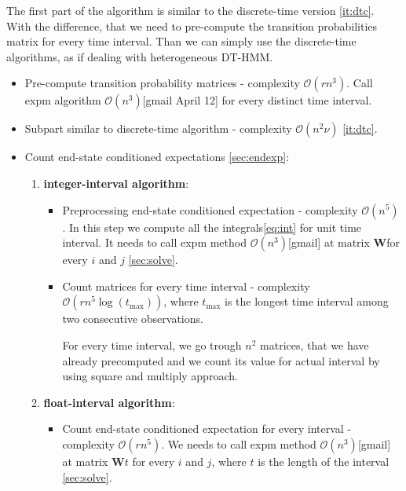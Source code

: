 \documentclass[thesis=M,english]{FITthesis}[2012/10/20]
\newcommand{\matr}[1]{\mathbf{#1}}
\begin{document}
\begin{itemize}
The first part of the algorithm is similar to the discrete-time version \ref{it:dtc}. With the difference, that we need to pre-compute the transition probabilities matrix for every time interval. Than we can simply use the discrete-time algorithms, as if dealing with heterogeneous DT-HMM. 


\begin{itemize}\label{it:ctc}
\item Pre-compute transition probability matrices - complexity $\mathcal{O}(r n^3)$. Call expm algorithm $\mathcal{O}(n^3)$[gmail April 12] for every distinct time interval. %
\item Subpart similar to discrete-time algorithm - complexity $\mathcal{O}(n^2 \nu)$ \ref{it:dtc}.
\item 

Count end-state conditioned expectations \ref{sec:endexp}:
\begin{enumerate}[resume]
\setcounter{enumi}{0}
\item \textbf{integer-interval algorithm}:

\begin{itemize}
\item Preprocessing end-state conditioned expectation - complexity $\mathcal{O}(n^5)$. 
    In this step we compute all the integrals\eqref{eq:int} for unit time interval. It needs to call expm method $\mathcal{O}(n^3)$[gmail] at matrix $\matr{W}$for every $i$ and $j$ \ref{sec:solve}.   
\item Count matrices for every time interval - complexity $\mathcal{O}(r n^5\log(t_{\max}))$, where $t_{\max}$ is the longest time interval among two consecutive observations.

For every time interval, we go trough $n^2$ matrices, that we have already precomputed and we count its value for actual interval by using square and multiply approach. 


\end{itemize}

\item \textbf{float-interval algorithm}: 
\begin{itemize}
\item Count end-state conditioned expectation for every interval - complexity $\mathcal{O}(r n^5)$. 
We needs to call expm method $\mathcal{O}(n^3)$[gmail] at matrix $\matr{W}t$ for every $i$ and $j$, where $t$ is the length of the interval \ref{sec:solve}.
\end{itemize}
\end{enumerate}
 

\end{itemize}
\end{itemize}
\end{document}
